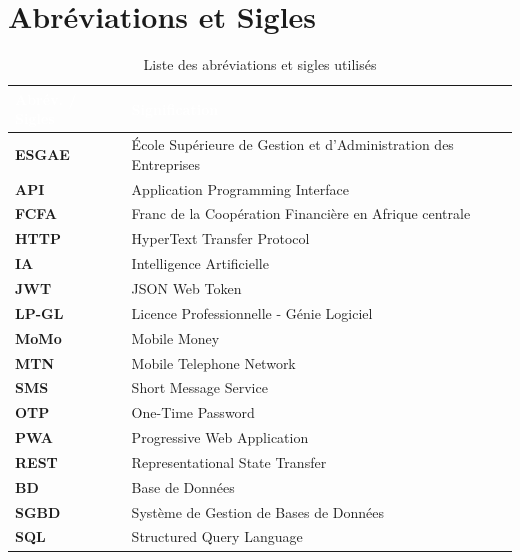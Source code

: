 \chapter*{Abréviations et Sigles}
\pagestyle{styleGlobal}
\label{sec:abreviations}

\begin{table}[H]
	\caption{Liste des abréviations et sigles utilisés}
	\label{tab:abreviations}
	\centering
	\begin{tabular}{|p{3.2cm}|p{10cm}|}
		\hline
		\rowcolor{vertCongo}
		\textcolor{white}{\textbf{Abrév. / Sigles}} & \textcolor{white}{\textbf{Signification}} \\
		\hline
		\textbf{ESGAE}  & École Supérieure de Gestion et d'Administration des Entreprises \\[3pt]
		\hline
		\textbf{API}    & Application Programming Interface \\[3pt]
		\hline
		\textbf{FCFA}   & Franc de la Coopération Financière en Afrique centrale \\[3pt]
		\hline
		\textbf{HTTP}   & HyperText Transfer Protocol \\[3pt]
		\hline
		\textbf{IA}     & Intelligence Artificielle \\[3pt]
		\hline
		\textbf{JWT}    & JSON Web Token \\[3pt]
		\hline
		\textbf{LP-GL}  & Licence Professionnelle - Génie Logiciel \\[3pt]
		\hline
		\textbf{MoMo}   & Mobile Money \\[3pt]
		\hline
		\textbf{MTN}    & Mobile Telephone Network \\[3pt]
		\hline
		\textbf{SMS}    & Short Message Service \\[3pt]
		\hline
		\textbf{OTP}    & One-Time Password \\[3pt]
		\hline
		\textbf{PWA}    & Progressive Web Application \\[3pt]
		\hline
		\textbf{REST}   & Representational State Transfer \\[3pt]
		\hline
		\textbf{BD}     & Base de Données \\[3pt]
		\hline
		\textbf{SGBD}   & Système de Gestion de Bases de Données \\[3pt]
		\hline
		\textbf{SQL}    & Structured Query Language \\[3pt]

\end{tabular}
\end{table}
